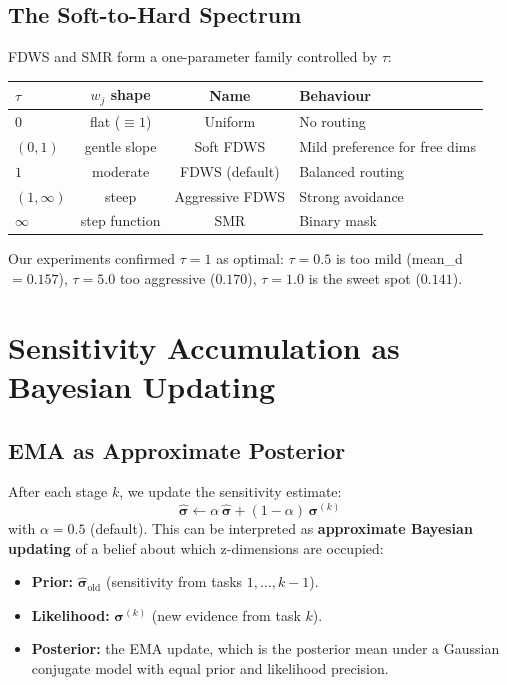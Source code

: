 \documentclass[11pt]{article}
\begin{document}
\subsection{The Soft-to-Hard Spectrum}

FDWS and SMR form a one-parameter family controlled by $\tau$:

\begin{center}
\begin{tabular}{lccl}
\toprule
$\tau$ & $w_j$ shape & Name & Behaviour \\
\midrule
$0$ & flat ($\equiv 1$) & Uniform & No routing \\
$(0, 1)$ & gentle slope & Soft FDWS & Mild preference for free dims \\
$1$ & moderate & FDWS (default) & Balanced routing \\
$(1, \infty)$ & steep & Aggressive FDWS & Strong avoidance \\
$\infty$ & step function & SMR & Binary mask \\
\bottomrule
\end{tabular}
\end{center}

Our experiments confirmed $\tau = 1$ as optimal: $\tau = 0.5$ is too mild (mean\_d $= 0.157$), $\tau = 5.0$ too aggressive ($0.170$), $\tau = 1.0$ is the sweet spot ($0.141$).

\section{Sensitivity Accumulation as Bayesian Updating}

\subsection{EMA as Approximate Posterior}

After each stage $k$, we update the sensitivity estimate:
\begin{equation}\label{eq:ema}
    \hat{\bm{\sigma}} \leftarrow \alpha\,\hat{\bm{\sigma}} + (1-\alpha)\,\bm{\sigma}^{(k)}
\end{equation}
with $\alpha = 0.5$ (default). This can be interpreted as \textbf{approximate Bayesian updating} of a belief about which z-dimensions are occupied:

\begin{itemize}[nosep]
    \item \textbf{Prior:} $\hat{\bm{\sigma}}_{\text{old}}$ (sensitivity from tasks $1, \ldots, k{-}1$).
    \item \textbf{Likelihood:} $\bm{\sigma}^{(k)}$ (new evidence from task $k$).
    \item \textbf{Posterior:} the EMA update, which is the posterior mean under a Gaussian conjugate model with equal prior and likelihood precision.
\end{itemize}
\end{document}
